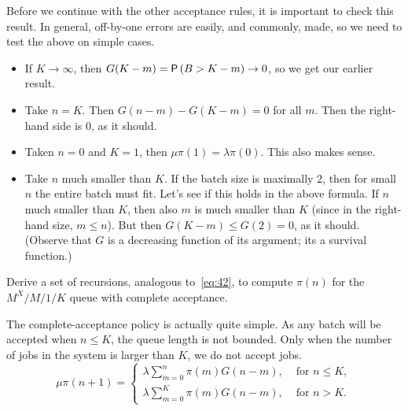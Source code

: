 \begin{exercise}
\begin{solution}
  Before we continue with the other acceptance rules, it is important
  to check this result.  In general, off-by-one errors are easily, and
  commonly, made, so we need to test the above on simple cases. 
  \begin{itemize}
  \item  If $K\to \infty$, then $G(K-m)=\P{B>K-m}\to 0$, so we get our earlier result. 
  \item Take $n=K$. Then $G(n-m)-G(K-m)=0$ for all $m$. Then the right-hand side is 0, as it should.
  \item Taken $n=0$ and $K=1$, then $\mu \pi(1)= \lambda \pi(0)$. This also makes sense. 
  \item Take $n$ much smaller than $K$. If the batch size is maximally
    $2$, then for small $n$ the entire batch must fit. Let's see if
    this holds in the above formula. If $n$ much smaller than $K$,
    then also $m$ is much smaller than $K$ (since in the right-hand
    size, $m\leq n$). But then $G(K-m) \leq G(2) = 0$, as it
    should. (Observe that $G$ is a decreasing function of its argument;
    its a survival function.)
  \end{itemize}
\end{solution}
\end{exercise}


\begin{extra}
  Derive a set of recursions, analogous to~\cref{eq:42}, to compute $\pi(n)$ for the $M^X/M/1/K$ queue with complete acceptance.
\begin{solution}
  The complete-acceptance policy is actually quite simple. As any
  batch will be accepted when $n\leq K$, the queue length is not
  bounded.  Only when the number of jobs in the system is larger than
  $K$, we do not accept jobs. 
  \begin{equation*}
    \mu \pi(n+1) = 
    \begin{cases}
      \lambda \sum_{m=0}^n \pi(m) G(n-m), & \text{ for } n\leq K,\\
      \lambda \sum_{m=0}^K \pi(m) G(n-m), & \text{ for } n> K.
    \end{cases}
  \end{equation*}
\end{solution}
\end{extra}

